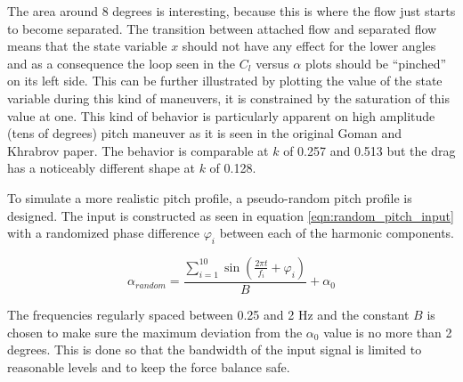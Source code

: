 \par The area around 8 degrees is interesting, because this is where the flow just starts to become separated.
The transition between attached flow and separated flow means that the state variable $x$ should not have any effect for the lower angles and as a consequence the loop seen in the $C_l$ versus $\alpha$ plots should be ``pinched'' on its left side.
This can be further illustrated by plotting the value of the state variable during this kind of maneuvers, it is constrained by the saturation of this value at one.
This kind of behavior is particularly apparent on high amplitude (tens of degrees) pitch maneuver as it is seen in the original Goman and Khrabrov paper.
The behavior is comparable at $k$ of 0.257 and 0.513 but the drag has a noticeably different shape at $k$ of 0.128.

\FloatBarrier



To simulate a more realistic pitch profile, a pseudo-random pitch profile is designed.
The input is constructed as seen in equation \ref{eqn:random_pitch_input} with a randomized phase difference $\varphi_i$ between each of the harmonic components.

\begin{equation}
	\alpha_{random}= \frac{\sum_{i=1}^{10} \sin (\frac{2 \pi t}{f_i} + \varphi_i)}{B} + \alpha_{0}
	\label{eqn:random_pitch_input}
\end{equation}

The frequencies regularly spaced between 0.25 and 2 Hz and the constant $B$ is chosen to make sure the maximum deviation from the $\alpha_0$ value is no more than 2 degrees.
This is done so that the bandwidth of the input signal is limited to reasonable levels and to keep the force balance safe.

